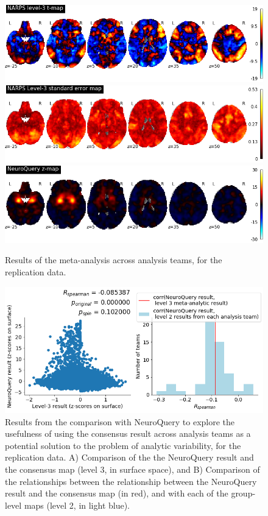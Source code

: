 \documentclass[a4paper,doc,natbib]{apa6}
\begin{document}
\begin{figure}[!htb]
	\includegraphics[width=\textwidth]
	{figures/results2A_hypo2_NARPS-level-3-t-map.png}
	\includegraphics[width=\textwidth]
	{figures/results2A_hypo2_NARPS-Level-3-standard-error-map.png}
	\includegraphics[width=\textwidth]
	{figures/results2A_hypo2_NeuroQuery-z-map.png}
	\caption{\label{fig:meta2} Results of the meta-analysis across analysis teams, for the replication data.}

\end{figure}
\begin{figure}[!htb]
	\includegraphics[width=\textwidth]
	{figures/results2B_hypo2_corr_with_NQ.png}
	\caption{\label{fig:corr_NQ2} Results from the comparison with NeuroQuery to explore the usefulness of using the consensus result across analysis teams as a potential solution to the problem of analytic variability, for the replication data. A) Comparison of the the NeuroQuery result and the consensus map (level 3, in surface space), and B) Comparison of the relationships between the relationship between the NeuroQuery result and the consensus map (in red), and with each of the group-level maps (level 2, in light blue).}

\end{figure}







\clearpage


\end{document}
